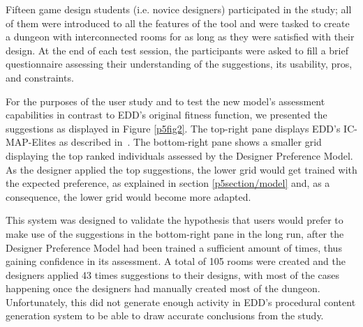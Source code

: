 Fifteen game design students (i.e. novice designers) participated in the study; all of them were introduced to all the features of the tool and were tasked to create a dungeon with interconnected rooms for as long as they were satisfied with their design. At the end of each test session, the participants were asked to fill a brief questionnaire assessing their understanding of the suggestions, its usability, pros, and constraints. 

For the purposes of the user study and to test the new model's assessment capabilities in contrast to EDD's original fitness function, we presented the suggestions as displayed in Figure \ref{p5fig2}. The top-right pane displays EDD's IC-MAP-Elites as described in~. The bottom-right pane shows a smaller grid displaying the top ranked individuals assessed by the Designer Preference Model. As the designer applied the top suggestions, the lower grid would get trained with the expected preference, as explained in section \ref{p5section/model} and, as a consequence, the lower grid would become more adapted.

This system was designed to validate the hypothesis that users would prefer to make use of the suggestions in the bottom-right pane in the long run, after the Designer Preference Model had been trained a sufficient amount of times, thus gaining confidence in its assessment. A total of 105 rooms were created and the designers applied 43 times suggestions to their designs, with most of the cases happening once the designers had manually created most of the dungeon. Unfortunately, this did not generate enough activity in EDD's procedural content generation system to be able to draw accurate conclusions from the study.   
